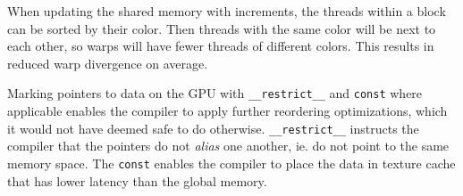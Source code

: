 When updating the shared memory with increments, the threads within a block can 
be sorted by their color. Then threads with the same color will be next to each 
other, so warps will have fewer threads of different colors. This results in 
reduced warp divergence on average.

Marking pointers to data on the GPU with \lstinline!__restrict__! and 
\lstinline!const! where applicable enables the compiler to apply further 
reordering optimizations, which it would not have deemed safe to do otherwise. 
\lstinline!__restrict__! instructs the compiler that the pointers do not 
\emph{alias} one another, ie. do not point to the same memory space. The 
\lstinline!const! enables the compiler to place the data in texture cache that 
has lower latency than the global memory.




